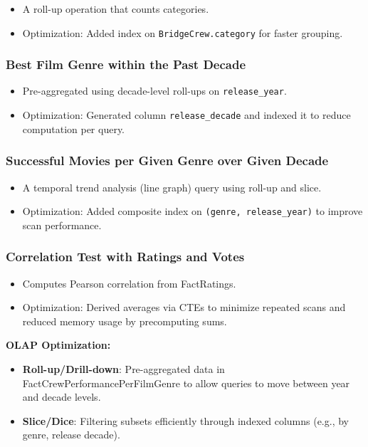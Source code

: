 \begin{itemize}
\item A roll-up operation that counts categories.  
\item Optimization: Added index on \texttt{BridgeCrew.category} for faster grouping.
\end{itemize}

\subsubsection{Best Film Genre within the Past Decade}

\begin{itemize}
\item Pre-aggregated using decade-level roll-ups on \texttt{release\_year}.  
\item Optimization: Generated column \texttt{release\_decade} and indexed it to reduce computation per query.
\end{itemize}

\subsubsection{Successful Movies per Given Genre over Given Decade}

\begin{itemize}
\item A temporal trend analysis (line graph) query using roll-up and slice.  
\item Optimization: Added composite index on \texttt{(genre, release\_year)} to improve scan performance.
\end{itemize}

\subsubsection{Correlation Test with Ratings and Votes}

\begin{itemize}
\item Computes Pearson correlation from FactRatings.  
\item Optimization: Derived averages via CTEs to minimize repeated scans and reduced memory usage by precomputing sums.
\end{itemize}

\textbf{OLAP Optimization:}
\begin{itemize}
	\item \textbf{Roll-up/Drill-down}: Pre-aggregated data in FactCrewPerformancePerFilmGenre to allow queries to move between year and decade levels.
	\item \textbf{Slice/Dice}: Filtering subsets efficiently through indexed columns (e.g., by genre, release decade).
\end{itemize}

